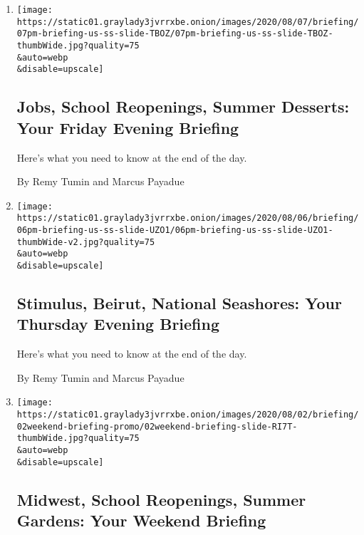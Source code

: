 \begin{enumerate}
\def\labelenumi{\arabic{enumi}.}
\item
  \href{/2020/08/07/briefing/jobs-school-reopenings-summer-desserts.html}{}

  \texttt{[image: https://static01.graylady3jvrrxbe.onion/images/2020/08/07/briefing/07pm-briefing-us-ss-slide-TBOZ/07pm-briefing-us-ss-slide-TBOZ-thumbWide.jpg?quality=75\\\&auto=webp\\\&disable=upscale]}

  \hypertarget{jobs-school-reopenings-summer-desserts-your-friday-evening-briefing}{%
  \subsection{Jobs, School Reopenings, Summer Desserts: Your Friday
  Evening
  Briefing}\label{jobs-school-reopenings-summer-desserts-your-friday-evening-briefing}}

  Here's what you need to know at the end of the day.

  By Remy Tumin and Marcus Payadue
\item
  \href{/2020/08/06/briefing/stimulus-beirut-national-seashores.html}{}

  \texttt{[image: https://static01.graylady3jvrrxbe.onion/images/2020/08/06/briefing/06pm-briefing-us-ss-slide-UZO1/06pm-briefing-us-ss-slide-UZO1-thumbWide-v2.jpg?quality=75\\\&auto=webp\\\&disable=upscale]}

  \hypertarget{stimulus-beirut-national-seashores-your-thursday-evening-briefing}{%
  \subsection{Stimulus, Beirut, National Seashores: Your Thursday
  Evening
  Briefing}\label{stimulus-beirut-national-seashores-your-thursday-evening-briefing}}

  Here's what you need to know at the end of the day.

  By Remy Tumin and Marcus Payadue
\item
  \href{/2020/08/02/briefing/midwest-school-reopenings-summer-gardens.html}{}

  \texttt{[image: https://static01.graylady3jvrrxbe.onion/images/2020/08/02/briefing/02weekend-briefing-promo/02weekend-briefing-slide-RI7T-thumbWide.jpg?quality=75\\\&auto=webp\\\&disable=upscale]}

  \hypertarget{midwest-school-reopenings-summer-gardens-your-weekend-briefing}{%
  \subsection{Midwest, School Reopenings, Summer Gardens: Your Weekend
  Briefing}\label{midwest-school-reopenings-summer-gardens-your-weekend-briefing}}


\end{enumerate}
